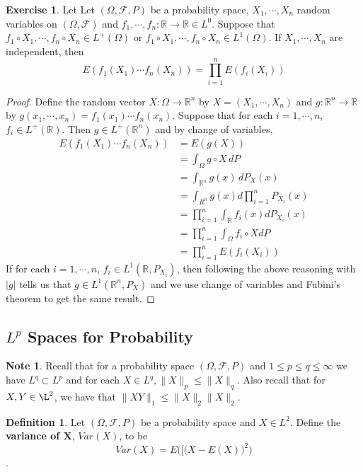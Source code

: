 \documentclass[12pt]{amsart}
\theoremstyle{definition}
\newtheorem{defn}[definition]{Definition}
\newtheorem{note}[definition]{Note}
\newtheorem{ex}[definition]{Exercise}
\newcommand{\Om}{\Omega}
\newcommand{\R}{\mathbb{R}}
\newcommand{\MF}{\mathcal{F}}
\newcommand{\dP}{\, d P}
\begin{document}
	\begin{ex}
		Let Let $(\Om, \MF, P)$ be a probability space, $X_1, \cdots, X_n$ random variables on $(\Om, \MF)$ and $f_1, \cdots, f_n: \R \rightarrow \R \in L^0$. Suppose that $f_1 \circ X_1, \cdots, f_n \circ X_n\in L^+(\Om)$ or $f_1 \circ X_1, \cdots, f_n \circ X_n \in L^1(\Om)$. If $X_1, \cdots, X_n$ are independent, then $$E(f_1(X_1) \cdots f_n(X_n)) = \prod_{i=1}^n E(f_i(X_i))$$
	\end{ex}
	
	\begin{proof}
		Define the random vector $X : \Om \rightarrow \R^n$ by $X = (X_1, \cdots, X_n)$ and $g:\R^n \rightarrow \R$ by $g(x_1, \cdots, x_n) = f_1(x_1) \cdots f_n(x_n)$. Suppose that for each $i = 1, \cdots, n$, $f_i \in L^+(\R)$. Then $g \in L^+(\R^n)$ and by change of variables,  
		\begin{align*}
			E(f_1(X_1) \cdots f_n(X_n)) 
			&= E(g(X)) \\
			&= \int_{\Om} g \circ X \dP \\
			&= \int_{\R^n} g(x) \dP_X(x) \\
			&= \int_{R^n} g(x) d \prod\limits_{i=1}^nP_{X_i}(x) \\
			&=  \prod_{i=1}^n \int_{\R}f_i(x) d P_{X_i}(x) \\ 
			&= \prod_{i=1}^n \int_{\Om}f_i \circ X d P \\
			&= \prod_{i=1}^n E(f_i(X_i))
		\end{align*}
		If for each $i = 1, \cdots, n$, $f_i \in L^1(\R, P_{X_i})$, then following the above reasoning with $\vert g \vert $ tells us that $g \in L^1(\R^n, P_X)$ and we use change of variables and Fubini's theorem to get the same result.  
	\end{proof}
	
	\subsection{$L^p$ Spaces for Probability}
	
	\begin{note}
		Recall that for a probability space $(\Om, \MF, P)$ and $1 \leq p \leq q \leq \infty$ we have $L^q \subset L^p$ and for each $X \in L^q, \|X \|_p \leq  \|X\|_q$. Also recall that for $X,Y \in \L^2$, we have that $\|XY \|_1 \leq \|X\|_2 \|X\|_2$.
	\end{note}
	
	\begin{defn}
		Let $(\Om, \MF, P)$ be a probability space and $X \in L^2$. Define the \textbf{variance of X}, $Var(X)$, to be $$Var(X) = E(\big[\big(X-E(X)\big)^2\big)$$.
	\end{defn}
	
\end{document}
